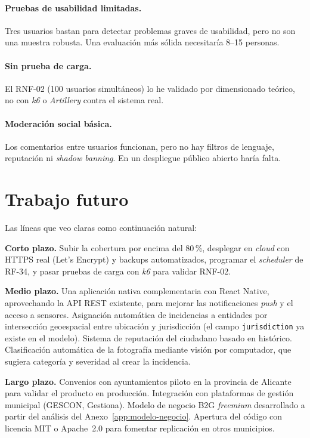 \paragraph{Pruebas de usabilidad limitadas.}  Tres usuarios bastan para detectar problemas graves de usabilidad, pero no son una muestra robusta. Una evaluación más sólida necesitaría 8--15 personas.

\paragraph{Sin prueba de carga.}  El RNF-02 (100 usuarios simultáneos) lo he validado por dimensionado teórico, no con \textit{k6} o \textit{Artillery} contra el sistema real.

\paragraph{Moderación social básica.}  Los comentarios entre usuarios funcionan, pero no hay filtros de lenguaje, reputación ni \textit{shadow banning}. En un despliegue público abierto haría falta.


\section{Trabajo futuro}
\label{sec:trabajo-futuro}

Las líneas que veo claras como continuación natural:

\textbf{Corto plazo.}  Subir la cobertura por encima del 80\,\%, desplegar en \textit{cloud} con HTTPS real (Let's Encrypt) y backups automatizados, programar el \textit{scheduler} de RF-34, y pasar pruebas de carga con \textit{k6} para validar RNF-02.

\textbf{Medio plazo.}  Una aplicación nativa complementaria con React Native, aprovechando la API REST existente, para mejorar las notificaciones \textit{push} y el acceso a sensores. Asignación automática de incidencias a entidades por intersección geoespacial entre ubicación y jurisdicción (el campo \texttt{jurisdiction} ya existe en el modelo). Sistema de reputación del ciudadano basado en histórico. Clasificación automática de la fotografía mediante visión por computador, que sugiera categoría y severidad al crear la incidencia.

\textbf{Largo plazo.}  Convenios con ayuntamientos piloto en la provincia de Alicante para validar el producto en producción. Integración con plataformas de gestión municipal (GESCON, Gestiona). Modelo de negocio B2G \textit{freemium} desarrollado a partir del análisis del Anexo~\ref{app:modelo-negocio}. Apertura del código con licencia MIT o Apache~2.0 para fomentar replicación en otros municipios.


